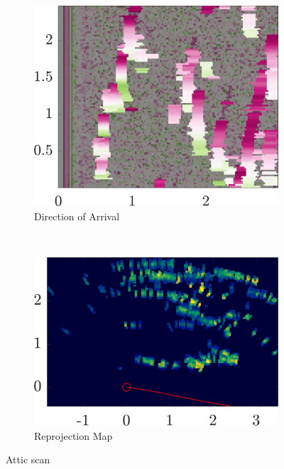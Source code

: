 \begin{figure}[htbp]
\begin{subfigure}[t]{0.32\linewidth}
    \end{subfigure}%
    \hfill%
    \begin{subfigure}[t]{0.32\linewidth}   
        \centering 
        \includegraphics[width=\linewidth]{gfx/results/attic_doa.png}
        \caption{\small Direction of Arrival}
    \end{subfigure}\\
    \begin{subfigure}[t]{0.475\linewidth}   
        \centering 
        \includegraphics[width=\linewidth]{gfx/results/attic_reprojection.png}
        \caption{\small Reprojection Map}
    \end{subfigure}%
    \caption{Attic scan}
\end{figure}


